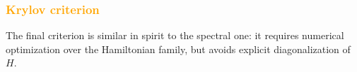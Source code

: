 \documentclass[aps,prx,reprint,superscriptaddress,footnote, twocolumn,notitlepage]{revtex4-2}
\newcommand{\ko}[1]{\textcolor{orange}{#1}}
\begin{document}

\subsubsection{\ko{Krylov criterion}}
The final criterion is similar in spirit to the spectral one: it requires numerical optimization over the Hamiltonian family, but avoids explicit diagonalization of $H$.
\end{document}

